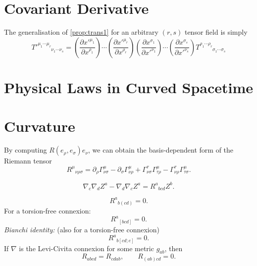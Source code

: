 \documentclass[12pt]{article}
\begin{document}
\section{Covariant Derivative}

\begin{noteEquation}
The generalisation of \autoref{prop:trans1} for an arbitrary $(r,s)$ tensor field is simply
\begin{equation}
T'^{\mu_1 \cdots \mu_r}_{\phantom{\mu_1 \cdots \mu_r} \nu_1 \cdots \nu_s} = \left( \frac{\partial x'^{\mu_1}}{\partial x^{\rho_1}} \right) \cdots \left( \frac{\partial x'^{\mu_r}}{\partial x^{\rho_r}} \right) \left( \frac{\partial x^{\sigma_1}}{\partial x'^{\nu_1}} \right) \cdots \left( \frac{\partial x^{\sigma_s}}{\partial x'^{\nu_s}} \right) T^{\rho_1 \cdots \rho_r}_{\phantom{\rho_1 \cdots \rho_r} \sigma_1 \cdots \sigma_s}
\end{equation}
\end{noteEquation}

\section{Physical Laws in Curved Spacetime}

\section{Curvature}

\begin{noteEquation}
By computing $R(e_\rho, e_\sigma) e_\nu$, we can obtain the basis-dependent form of the Riemann tensor
\begin{equation}
{R^\mu}_{\nu \rho \sigma} = \partial_\rho \Gamma^\mu_{\nu\sigma}
 - \partial_\sigma \Gamma^\mu_{\nu\rho} + \Gamma^\tau_{\nu\sigma}\Gamma^\mu_{\tau\rho} - \Gamma^\tau_{\nu\rho}\Gamma^\mu_{\tau\sigma}.
  \end{equation}
\end{noteEquation}

\begin{noteEquation}
\begin{equation}
\nabla_c \nabla_d Z^a - \nabla_d \nabla_c Z^a = {R^a}_{bcd} Z^b.
\end{equation}
\end{noteEquation}

\begin{noteEquation}
\begin{equation}
{R^a}_{b(cd)} = 0.
\end{equation}
For a torsion-free connexion:
\begin{equation}
{R^a}_{[bcd]} = 0.
\end{equation}
\textit{Bianchi identity:} (also for a torsion-free connexion)
\begin{equation}
{R^a}_{b[cd;e]} = 0.
\end{equation}
If $\nabla$ is the Levi-Civita connexion for some metric $g_{ab}$, then
\begin{equation}
R_{abcd} = R_{cdab}, \qquad R_{(ab)cd} = 0.
\end{equation}
\end{noteEquation}
\end{document}

